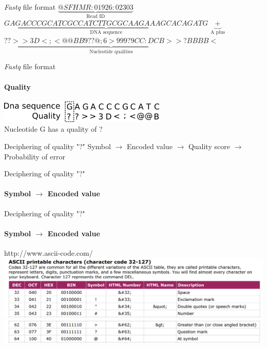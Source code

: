 \documentclass{beamer}
\begin{document}
\newcommand{\fastq}{\textit{fastq}}
\begin{frame}{\textit{Fastq} file format}
	$\underbrace{@SFHMR:01926:02303}_\text{Read ID}$
	\pause 
	$\underbrace{GAGACCCGCATCGCCATCTTGCGCAAGAAAGCACAGATG}_\text{DNA sequence}$
	\pause
	$\underbrace{+}_\text{A plus}$
	\pause
	$\underbrace{??>>3D<;<@@BB9??@;6>999?9CC:DCB>>?BBBB<}_\text{Nucleotide qualities}$
\end{frame}
\begin{frame}{\textit{Fastq} file format}
\framesubtitle{Quality}
\includegraphics[width=8cm, keepaspectratio]{pic/fq_qual.png} \\
Nucleotide G has a quality of ?
\end{frame}

\begin{frame}{Deciphering of quality "?"}
Symbol $\rightarrow$ Encoded value $\rightarrow$ Quality score $\rightarrow$ Probability of error
\end{frame}

\begin{frame}{Deciphering of quality "?"}
\framesubtitle{Symbol $\rightarrow$ Encoded value}
\end{frame}

\begin{frame}{Deciphering of quality "?"}
\framesubtitle{Symbol $\rightarrow$ Encoded value}
http://www.ascii-code.com/ \\
\includegraphics[width=\linewidth, keepaspectratio]{pic/ascii_head3.png} \\
\includegraphics[width=\linewidth, keepaspectratio]{pic/ascii_tail3.png} \\
\end{frame}
\end{document}
